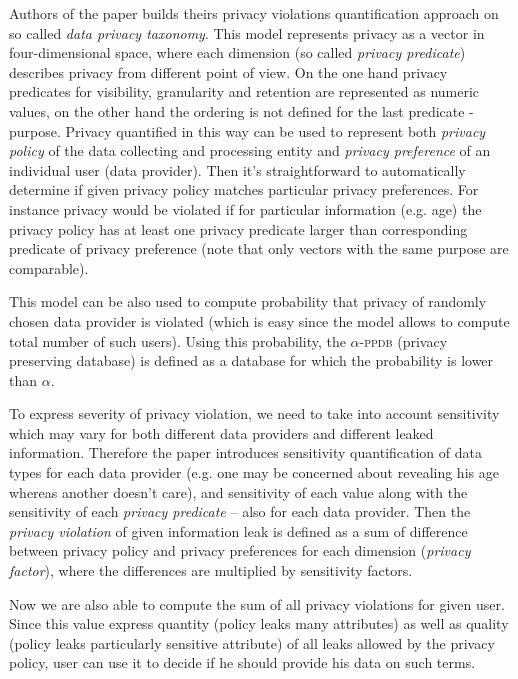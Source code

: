 \documentclass[a4paper]{article}
\begin{document}
Authors of the paper \cite{paper_qpv} builds theirs privacy violations
quantification approach on so called \emph{data privacy taxonomy}.
This model represents privacy as a vector in four-dimensional space,
where each dimension (so called \emph{privacy predicate}) describes privacy
from different point of view. On the one hand privacy predicates for
visibility,
granularity and retention are represented as numeric values, on the other hand
the ordering is not defined for the last predicate - purpose.
Privacy quantified in this way can be used to represent both \emph{privacy
policy} of the data collecting and processing entity and \emph{privacy
preference} of an individual user (data provider).
Then it's straightforward to automatically determine if given privacy policy
matches particular privacy preferences. For instance privacy would be violated
if for particular information (e.g. age) the privacy policy has at least one
privacy predicate larger than corresponding predicate of privacy preference
(note that only vectors with the same purpose are comparable).

This model can be also used to compute probability that privacy of randomly
chosen data provider is violated (which is easy since the model allows to
compute total number of such users).
Using this probability, the $\alpha$-\textsc{ppdb} (privacy preserving
database) is defined as a database for which the probability is lower than
$\alpha$.

To express severity of privacy violation, we need to take into account
sensitivity which may vary for both different data providers and different
leaked information.
Therefore the paper introduces sensitivity quantification of data types for
each data provider (e.g. one may be concerned about revealing his age whereas
another doesn't care), and sensitivity of each value
along with the sensitivity of each \emph{privacy predicate} -- also for each
data provider.
Then the \emph{privacy violation} of given information leak is defined as a sum
of difference between privacy policy and privacy preferences for each
dimension (\emph{privacy factor}), where the differences are multiplied by
sensitivity factors.

Now we are also able to compute the sum of all privacy violations for given
user. Since this value express quantity (policy leaks many attributes) as well
as quality (policy leaks particularly sensitive attribute) of all leaks allowed
by the privacy policy, user can use it to decide if he should provide his data
on such terms.
\end{document}
